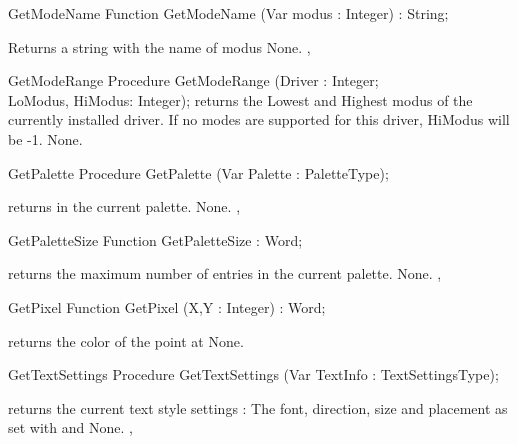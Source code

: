 \begin{function}{GetModeName}
\Declaration
Function GetModeName (Var modus : Integer) : String;

\Description

Returns a string with the name of modus
\Errors
None.
\SeeAlso
{}, 
\end{function}

\begin{procedure}{GetModeRange}
\Declaration
Procedure GetModeRange (Driver : Integer; \\ LoModus, HiModus: Integer);
\Description
{} returns the Lowest and Highest modus of the currently
installed driver. If no modes are supported for this driver, HiModus
will be -1.
\Errors
None.
\SeeAlso
{}
\end{procedure}

\begin{procedure}{GetPalette}
\Declaration
Procedure GetPalette (Var Palette : PaletteType);

\Description
{} returns in  the current palette.
\Errors
None.
\SeeAlso
{}, 
\end{procedure}

\begin{function}{GetPaletteSize}
\Declaration
Function GetPaletteSize  : Word;

\Description
{} returns the maximum
number of entries in the current palette.
\Errors
None.
\SeeAlso
{},
\end{function}

\begin{function}{GetPixel}
\Declaration
Function GetPixel (X,Y : Integer) : Word;

\Description
{} returns the color
of the point at  
\Errors
None.
\SeeAlso

\end{function}

\begin{procedure}{GetTextSettings}
\Declaration
Procedure GetTextSettings (Var TextInfo : TextSettingsType);

\Description
{} returns the current text style settings : The font,
direction, size and placement as set with  and
\Errors
None.
\SeeAlso
{}, 
\end{procedure}

